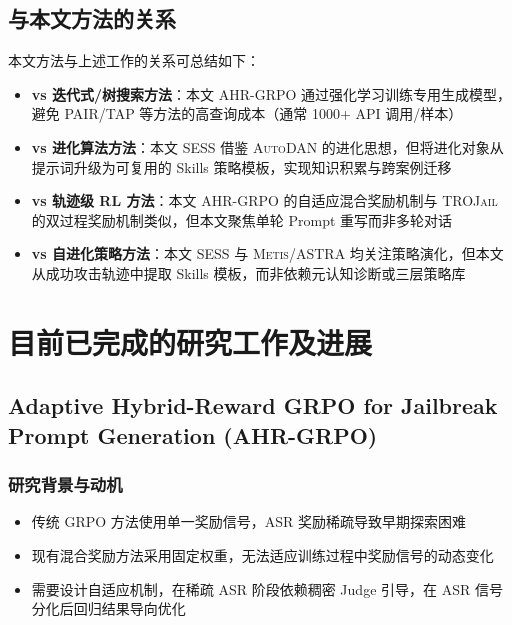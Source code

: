 \documentclass[12pt,a4paper]{article}
\newcommand{\PAIR}{\textsc{PAIR}}
\begin{document}
\subsection{与本文方法的关系}

本文方法与上述工作的关系可总结如下：

\begin{itemize}
    \item \textbf{vs 迭代式/树搜索方法}：本文 AHR-GRPO 通过强化学习训练专用生成模型，避免 \PAIR/\textsc{TAP} 等方法的高查询成本（通常 1000+ API 调用/样本）
    \item \textbf{vs 进化算法方法}：本文 SESS 借鉴 \textsc{AutoDAN} 的进化思想，但将进化对象从提示词升级为可复用的 Skills 策略模板，实现知识积累与跨案例迁移
    \item \textbf{vs 轨迹级 RL 方法}：本文 AHR-GRPO 的自适应混合奖励机制与 \textsc{TROJail} 的双过程奖励机制类似，但本文聚焦单轮 Prompt 重写而非多轮对话
    \item \textbf{vs 自进化策略方法}：本文 SESS 与 \textsc{Metis}/\textsc{ASTRA} 均关注策略演化，但本文从成功攻击轨迹中提取 Skills 模板，而非依赖元认知诊断或三层策略库
\end{itemize}

\section{目前已完成的研究工作及进展}

\subsection{Adaptive Hybrid-Reward GRPO for Jailbreak Prompt Generation (AHR-GRPO)}

\subsubsection{研究背景与动机}

\begin{itemize}
    \item 传统 GRPO 方法使用单一奖励信号，ASR 奖励稀疏导致早期探索困难
    \item 现有混合奖励方法采用固定权重，无法适应训练过程中奖励信号的动态变化
    \item 需要设计自适应机制，在稀疏 ASR 阶段依赖稠密 Judge 引导，在 ASR 信号分化后回归结果导向优化
\end{itemize}
\end{document}
